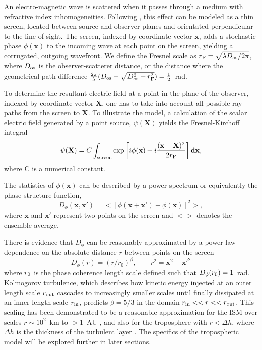 An electro-magnetic wave is scattered when it passes through a medium with refractive index inhomogeneities. Following \citet{Narayan_1992}, this effect can be modeled as a thin screen, located between source and observer planes and orientated perpendicular to the line-of-sight. The screen, indexed by coordinate vector $\mathbf{x}$, adds a stochastic phase $\phi(\mathbf{x})$ to the incoming wave at each point on the screen, yielding a corrugated, outgoing wavefront. We define the Fresnel scale as  $r_{\rm F} = \sqrt{\lambda D_{\rm os}/2\pi}$, where $D_{\rm os}$ is the observer-scatterer distance, or the distance where the geometrical path difference $\frac{2\pi}{\lambda} (D_{\rm os} - \sqrt{D_{\rm os}^2 + r_{\rm F}^2}) =\frac{1}{2}$~rad.

To determine the resultant electric field at a point in the plane of the observer, indexed by coordinate vector $\mathbf{X}$, one has to take into account all possible ray paths from the screen to $\mathbf{X}$. To illustrate the model, a calculation of the scalar electric field generated by a point source, $\psi(\mathbf{X})$ yields the Fresnel-Kirchoff integral \citep*{BORN_1980}
\begin{equation}\label{Fresnel- Kirchoff}
\psi(\mathbf{X}) = C \int_{\rm screen} \exp\left[i\phi(\mathbf{x}) + i \frac{(\mathbf{x}-\mathbf{X})^2}{2 r_{\rm F}}\right]\mathbf{dx},
\end{equation}
where C is a numerical constant.

The statistics of $\phi(\mathbf{x})$ can be described by a power spectrum or equivalently the phase structure function,
\begin{equation}\label{eq:D_phi}
D_\phi (\mathbf{x},\mathbf{x'}) = < \left[ \phi(\mathbf{x} +\mathbf{x'}) - \phi(\mathbf{x})\right]^2 >,
\end{equation}
where $\mathbf{x}$ and $\mathbf{x'} $ represent two points on the screen and $<>$ denotes the ensemble average. 

There is evidence that $D_\phi$ can be reasonably approximated by a power law dependence on the absolute distance $r$ between points on the screen  \citep{Armstrong_1995,carilli_1997}
\begin{equation}
D_\phi (r) =  (r/r_0)^\beta,\qquad r^2 = \mathbf{x}^2 - \mathbf{x'}^2
\label{kolmogorov}
\end{equation}
where $r_{\rm 0}$ is the phase coherence length scale defined such that $D_\phi(r_{\rm 0}) = 1$~rad. 
Kolmogorov turbulence, which describes how kinetic energy injected at an outer length scale $r_{\rm out}$ cascades to increasingly smaller scales until finally dissipated at an inner length scale $r_{\rm in}$, predicts $\beta = 5/3$ in the domain ${r_{\rm in}<<r<<r_{\rm out}}$. This scaling has been demonstrated to be a reasonable approximation for the ISM over scales $r \sim 10^2$~km to $>1$~AU \citep*{Johnson_2015a}, and also for the troposphere with $r< \Delta h$, where $\Delta h$ is the thickness of the turbulent layer \cite{Coulman_1985}. The specifics of the tropospheric model will be explored further in later sections.


